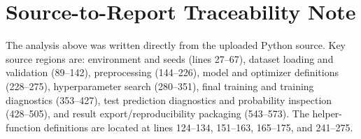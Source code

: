 \documentclass[11pt,a4paper]{article}
\begin{document}
\section*{Source-to-Report Traceability Note}
The analysis above was written directly from the uploaded Python source. Key source regions are: environment and seeds (lines 27--67), dataset loading and validation (89--142), preprocessing (144--226), model and optimizer definitions (228--275), hyperparameter search (280--351), final training and training diagnostics (353--427), test prediction diagnostics and probability inspection (428--505), and result export/reproducibility packaging (543--573). The helper-function definitions are located at lines 124--134, 151--163, 165--175, and 241--275.
\end{document}
